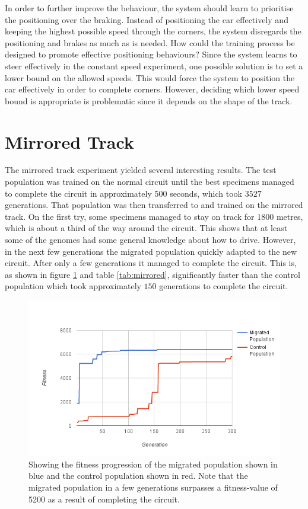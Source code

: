 In order to further improve the behaviour, the system should learn to prioritise the positioning over the braking. Instead of positioning the car effectively and keeping the highest possible speed through the corners, the system disregards the positioning and brakes as much as is needed. How could the training process be designed to promote effective positioning behaviours? Since the system learns to steer effectively in the constant speed experiment, one possible solution is to set a lower bound on the allowed speeds. This would force the system to position the car effectively in order to complete corners. However, deciding which lower speed bound is appropriate is problematic since it depends on the shape of the track. 


\section{Mirrored Track}
\label{result:mirror}
The mirrored track experiment yielded several interesting results. The test population was trained on the normal circuit until the best specimens managed to complete the circuit in approximately $500$ seconds, which took $3527$ generations. That population was then transferred to and trained on the mirrored track. On the first try, some specimens managed to stay on track for $1800$ metres, which is about a third of the way around the circuit. This shows that at least some of the genomes had some general knowledge about how to drive. However, in the next few generations the migrated population quickly adapted to the new circuit. After only a few generations it managed to complete the circuit. This is, as shown in figure \ref{fig:mirrordata} and table \ref{tab:mirrored}, significantly faster than the control population which took approximately $150$ generations to complete the circuit. 

\begin{figure}[H]
\includegraphics[width=\textwidth]{report/images/graphs/mirror_migration}
\centering
\caption{Showing the fitness progression of the migrated population shown in blue and the control population shown in red. Note that the migrated population in a few generations surpasses a fitness-value of 5200 as a result of completing the circuit.}
\label{fig:mirrordata}
\end{figure}

